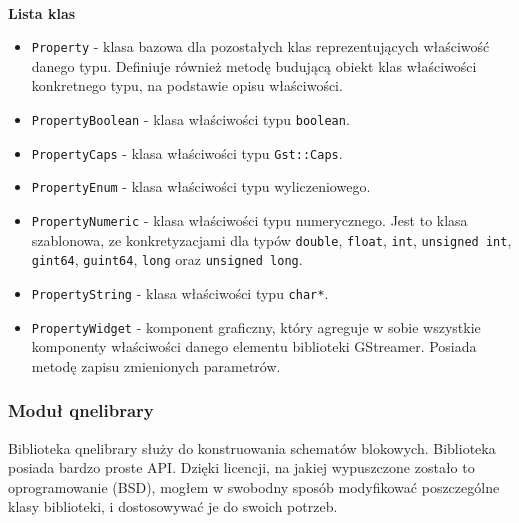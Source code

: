 \documentclass[12pt]{article}
\begin{document}
\paragraph{}
\textbf{Lista klas}
\vspace{-2mm}
\begin{itemize}
  \setlength{\itemsep}{0em}
\item \texttt{Property} - klasa bazowa dla pozostałych klas reprezentujących właściwość danego typu. Definiuje również metodę budującą obiekt  klas właściwości konkretnego typu, na podstawie opisu właściwości.
\item \texttt{PropertyBoolean} - klasa właściwości typu \texttt{boolean}.
\item \texttt{PropertyCaps} - klasa właściwości typu \texttt{Gst::Caps}.
\item \texttt{PropertyEnum} - klasa właściwości typu wyliczeniowego.
\item \texttt{PropertyNumeric} - klasa właściwości typu numerycznego. Jest to klasa szablonowa, ze konkretyzacjami dla typów \texttt{double}, \texttt{float}, \texttt{int}, \texttt{unsigned int}, \texttt{gint64}, \texttt{guint64}, \texttt{long} oraz \texttt{unsigned long}.
\item \texttt{PropertyString} - klasa właściwości typu \texttt{char*}.
\item \texttt{PropertyWidget} - komponent graficzny, który agreguje w sobie wszystkie komponenty właściwości danego elementu biblioteki GStreamer. Posiada metodę zapisu zmienionych parametrów.
\end{itemize}
\subsubsection{Moduł qnelibrary}
Biblioteka qnelibrary\cite{algoholic} służy do konstruowania schematów blokowych. Biblioteka posiada bardzo proste API. Dzięki licencji, na jakiej wypuszczone zostało to oprogramowanie (BSD), mogłem w swobodny sposób modyfikować poszczególne klasy biblioteki, i dostosowywać je do swoich potrzeb.
\end{document}
